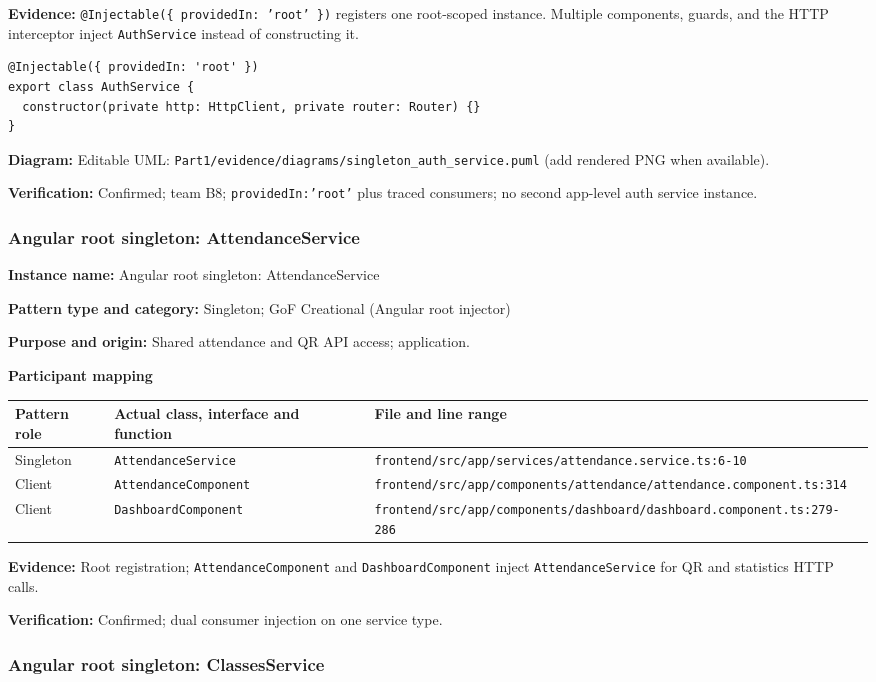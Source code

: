 \documentclass[11pt,a4paper]{article}
\newcommand{\fp}[1]{\nolinkurl{#1}}
\newcommand{\filledentry}[2]{\textbf{#1:} #2\par}
\begin{document}
\filledentry{Evidence}{\texttt{@Injectable(\{ providedIn: 'root' \})} registers one root-scoped instance. Multiple components, guards, and the HTTP interceptor inject \texttt{AuthService} instead of constructing it.}
\begin{lstlisting}
@Injectable({ providedIn: 'root' })
export class AuthService {
  constructor(private http: HttpClient, private router: Router) {}
}
\end{lstlisting}
\filledentry{Diagram}{Editable UML: \texttt{Part1/evidence/diagrams/singleton\_auth\_service.puml} (add rendered PNG when available).}
\filledentry{Verification}{Confirmed; team B8; \texttt{providedIn:'root'} plus traced consumers; no second app-level auth service instance.}

\subsubsection{Angular root singleton: AttendanceService}

\filledentry{Instance name}{Angular root singleton: AttendanceService}
\filledentry{Pattern type and category}{Singleton; GoF Creational (Angular root injector)}
\filledentry{Purpose and origin}{Shared attendance and QR API access; application.}

\textbf{Participant mapping}\par
\begin{tabularx}{\linewidth}{@{}p{2.4cm}LL@{}}
\toprule
Pattern role & Actual class, interface and function & File and line range\\
\midrule
Singleton & \texttt{AttendanceService} & \fp{frontend/src/app/services/attendance.service.ts:6-10}\\
Client & \texttt{AttendanceComponent} & \fp{frontend/src/app/components/attendance/attendance.component.ts:314}\\
Client & \texttt{DashboardComponent} & \fp{frontend/src/app/components/dashboard/dashboard.component.ts:279-286}\\
\bottomrule
\end{tabularx}

\filledentry{Evidence}{Root registration; \texttt{AttendanceComponent} and \texttt{DashboardComponent} inject \texttt{AttendanceService} for QR and statistics HTTP calls.}
\filledentry{Verification}{Confirmed; dual consumer injection on one service type.}

\subsubsection{Angular root singleton: ClassesService}
\end{document}
